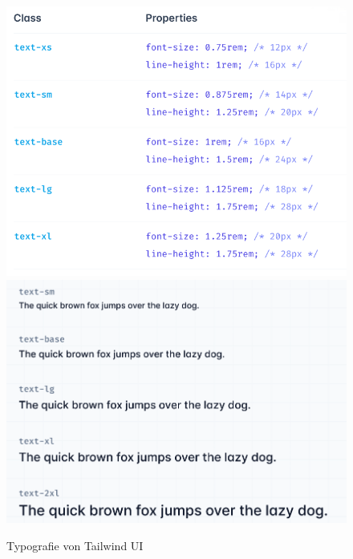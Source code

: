 \begin{figure}[h]
    \centering
    \includegraphics[scale=0.2]{Bilder/Prototyp/Screenshot 2022-09-27 at 15-07-24 Font Size - Tailwind CSS.png}
    \includegraphics[scale=0.2]{Bilder/Prototyp/Screenshot 2022-09-27 at 15-07-37 Font Size - Tailwind CSS.png}
    \caption[Typografie von Tailwind UI]{Typografie von Tailwind UI}
    \label{fig:schrift}
\end{figure}


